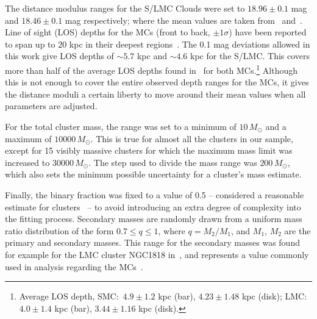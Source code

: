 \documentclass{aa}
\begin{document}
The distance modulus ranges for the S/LMC Clouds were set to
$18.96\pm0.1$ mag and $18.46\pm0.1$ mag respectively; where the mean values
are taken from~\cite{de_Grijs_2015} and~\cite{de_Grijs_2014}.
%
Line of sight (LOS) depths for the MCs (front to back, $\pm1\sigma$) have been
reported to span up to 20 kpc in their deepest
regions~\citep{Subramanian_2009,Nidever_2013,Scowcroft_2015}.
%
The 0.1 mag deviations allowed in this work give LOS depths of ${\sim}5.7$ kpc
and ${\sim}4.6$ kpc for the S/LMC\@. This covers more than half of the average
LOS depths found in~\cite{Subramanian_2009} for both MCs.\footnote
{Average LOS depth, SMC:\ $4.9\pm1.2$ kpc (bar), $4.23\pm1.48$ kpc 
(disk); LMC:\ $4.0\pm1.4$ kpc (bar), $3.44\pm1.16$ kpc (disk).}
Although this is not enough to cover the entire observed depth ranges for the
MCs, it gives the distance moduli a certain liberty to move around their mean
values when all parameters are adjusted.

For the total cluster mass, the range was set to a minimum of
$10\,M_ {\odot}$ and a maximum of $10000\,M_{\odot}$. This is true for almost
all the clusters in our sample, except for 15 visibly massive clusters for
which the maximum mass limit was increased to $30000\,M_{\odot}$.
The step used to divide the mass range was $200\,M_{\odot}$, which also sets the
minimum possible uncertainty for a cluster's mass estimate.

Finally, the binary fraction was fixed to a value of 0.5 -- considered a
reasonable estimate for clusters~\citep{von_Hippel_2005,Sollima_2010} -- to avoid
introducing an extra degree of complexity into the fitting process. Secondary
masses are randomly drawn from a uniform mass ratio distribution of the form
$0.7{\le}q{\le}1$, where $q{=}M_2/M_1$, and $M_1$, $M_2$ are the primary and
secondary masses. This range for the secondary masses was found for example for
the LMC cluster NGC1818 in~\cite{Elson_1998}, and represents a value commonly
used in analysis regarding the
MCs~\citep[see][and references therein]{Rubele_2011}.
\end{document}
